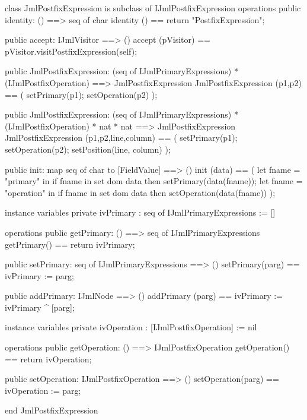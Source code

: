 \begin{vdm_al}
class JmlPostfixExpression is subclass of IJmlPostfixExpression
operations
  public identity: () ==> seq of char
  identity () == return "PostfixExpression";

  public accept: IJmlVisitor ==> ()
  accept (pVisitor) == pVisitor.visitPostfixExpression(self);

  public JmlPostfixExpression:
    (seq of IJmlPrimaryExpressions) *
    (IJmlPostfixOperation) ==> JmlPostfixExpression
  JmlPostfixExpression (p1,p2) == 
    ( setPrimary(p1);
      setOperation(p2) );

  public JmlPostfixExpression:
    (seq of IJmlPrimaryExpressions) *
    (IJmlPostfixOperation) *
    nat *
    nat ==> JmlPostfixExpression
  JmlPostfixExpression (p1,p2,line,column) == 
    ( setPrimary(p1);
      setOperation(p2);
      setPosition(line, column) );

  public init: map seq of char to [FieldValue] ==> ()
  init (data) ==
    ( let fname = "primary" in
        if fname in set dom data
        then setPrimary(data(fname));
      let fname = "operation" in
        if fname in set dom data
        then setOperation(data(fname)) );

instance variables
  private ivPrimary : seq of IJmlPrimaryExpressions := []

operations
  public getPrimary: () ==> seq of IJmlPrimaryExpressions
  getPrimary() == return ivPrimary;

  public setPrimary: seq of IJmlPrimaryExpressions ==> ()
  setPrimary(parg) == ivPrimary := parg;

  public addPrimary: IJmlNode ==> ()
  addPrimary (parg) == ivPrimary := ivPrimary ^ [parg];

instance variables
  private ivOperation : [IJmlPostfixOperation] := nil

operations
  public getOperation: () ==> IJmlPostfixOperation
  getOperation() == return ivOperation;

  public setOperation: IJmlPostfixOperation ==> ()
  setOperation(parg) == ivOperation := parg;

end JmlPostfixExpression
\end{vdm_al}

